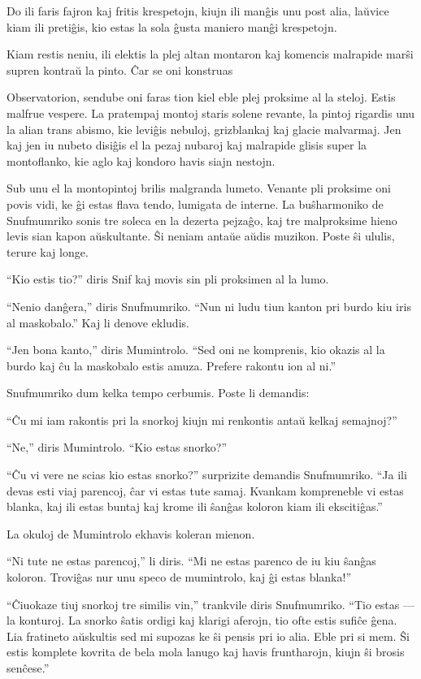 Do ili faris fajron kaj fritis krespetojn, kiujn ili manĝis unu post alia, laŭvice kiam ili pretiĝis, kio estas la sola ĝusta maniero manĝi krespetojn.

Kiam restis neniu, ili elektis la plej altan montaron kaj komencis malrapide marŝi supren kontraŭ la pinto. Ĉar se oni konstruas

Observatorion, sendube oni faras tion kiel eble plej proksime al la steloj.
\sectionbreak
Estis malfrue vespere. La pratempaj montoj staris solene revante, la pintoj rigardis unu la alian trans abismo, kie leviĝis nebuloj, grizblankaj kaj glacie malvarmaj. Jen kaj jen iu nubeto disiĝis el la pezaj nubaroj kaj malrapide glisis super la montoflanko, kie aglo kaj kondoro havis siajn nestojn.

Sub unu el la montopintoj brilis malgranda lumeto. Venante pli proksime oni povis vidi, ke ĝi estas flava tendo, lumigata de interne. La buŝharmoniko de Snufmumriko sonis tre soleca en la dezerta pejzaĝo, kaj tre malproksime hieno levis sian kapon aŭskultante. Ŝi neniam antaŭe aŭdis muzikon. Poste ŝi ululis, terure kaj longe.

``Kio estis tio?'' diris Snif kaj movis sin pli proksimen al la lumo.

``Nenio danĝera,'' diris Snufmumriko. ``Nun ni ludu tiun kanton pri burdo kiu iris al maskobalo.'' Kaj li denove ekludis.

``Jen bona kanto,'' diris Mumintrolo. ``Sed oni ne komprenis, kio okazis al la burdo kaj ĉu la maskobalo estis amuza. Prefere rakontu ion al ni.''

Snufmumriko dum kelka tempo cerbumis. Poste li demandis:

``Ĉu mi iam rakontis pri la snorkoj kiujn mi renkontis antaŭ kelkaj semajnoj?''

``Ne,'' diris Mumintrolo. ``Kio estas snorko?''

``Ĉu vi vere ne scias kio estas snorko?'' surprizite demandis Snufmumriko. ``Ja ili devas esti viaj parencoj, ĉar vi estas tute samaj. Kvankam kompreneble vi estas blanka, kaj ili estas buntaj kaj krome ili ŝanĝas koloron kiam ili ekscitiĝas.''

La okuloj de Mumintrolo ekhavis koleran mienon.

``Ni tute ne estas parencoj,'' li diris. ``Mi ne estas parenco de iu kiu ŝanĝas koloron. Troviĝas nur unu speco de mumintrolo, kaj ĝi estas blanka!''

``Ĉiuokaze tiuj snorkoj tre similis vin,'' trankvile diris Snufmumriko. ``Tio estas --- la konturoj. La snorko ŝatis ordigi kaj klarigi aferojn, tio ofte estis sufiĉe ĝena. Lia fratineto aŭskultis sed mi supozas ke ŝi pensis pri io alia. Eble pri si mem. Ŝi estis komplete kovrita de bela mola lanugo kaj havis fruntharojn, kiujn ŝi brosis senĉese.''

